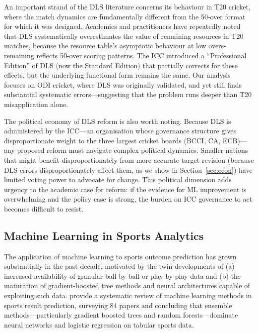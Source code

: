 \documentclass[10pt,a4paper,twocolumn]{article}
\begin{document}
An important strand of the DLS literature concerns its behaviour in T20 cricket, where the match dynamics are fundamentally different from the 50-over format for which it was designed. Academics and practitioners have repeatedly noted that DLS systematically overestimates the value of remaining resources in T20 matches, because the resource table's asymptotic behaviour at low overs-remaining reflects 50-over scoring patterns. The ICC introduced a ``Professional Edition'' of DLS (now the Standard Edition) that partially corrects for these effects, but the underlying functional form remains the same. Our analysis focuses on ODI cricket, where DLS was originally validated, and yet still finds substantial systematic errors---suggesting that the problem runs deeper than T20 misapplication alone.

The political economy of DLS reform is also worth noting. Because DLS is administered by the ICC---an organisation whose governance structure gives disproportionate weight to the three largest cricket boards (BCCI, CA, ECB)---any proposed reform must navigate complex political dynamics. Smaller nations that might benefit disproportionately from more accurate target revision (because DLS errors disproportionately affect them, as we show in Section~\ref{sec:econ}) have limited voting power to advocate for change. This political dimension adds urgency to the academic case for reform: if the evidence for ML improvement is overwhelming and the policy case is strong, the burden on ICC governance to act becomes difficult to resist.

\subsection{Machine Learning in Sports Analytics}

The application of machine learning to sports outcome prediction has grown substantially in the past decade, motivated by the twin developments of (a) increased availability of granular ball-by-ball or play-by-play data and (b) the maturation of gradient-boosted tree methods and neural architectures capable of exploiting such data. \citet{Bunker2019} provide a systematic review of machine learning methods in sports result prediction, surveying 84 papers and concluding that ensemble methods---particularly gradient boosted trees and random forests---dominate neural networks and logistic regression on tabular sports data.
\end{document}

